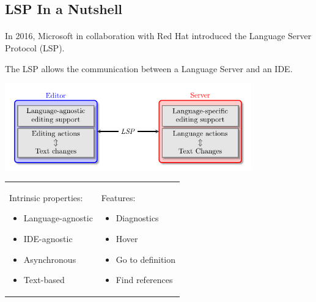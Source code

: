 \documentclass[9pt,xcolor=table,svgnames]{beamer}
\begin{document}
\subsection[In a Nutshell]{LSP In a Nutshell}
\begin{frame}{\secname}
    \framesubtitle{\subsecname}

    In 2016, \alert{Microsoft} in collaboration with \alert{Red Hat} introduced the \alert{Language Server Protocol} (LSP).

    \pause

    \bigskip
    The \alert{LSP} allows the communication between a \alert{Language Server} and an \alert{IDE}.

    \pause

    \begin{center}
    \includegraphics[width=0.8\textwidth]{figs/lsp-diagram.pdf}
    \end{center}

    \begin{tabular}{p{} p{}}
    Intrinsic properties:
    \begin{itemize}
        \item Language-agnostic
        \item IDE-agnostic
        \item Asynchronous
        \item Text-based
    \end{itemize}
        &
    Features:
    \begin{itemize}
        \item Diagnostics
        \item Hover
        \item Go to definition
        \item Find references
    \end{itemize}
    \end{tabular}
\end{frame}
\end{document}
